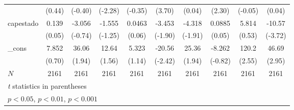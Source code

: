{\begin{tabular}{l*{9}{c}}
            &      (0.44)         &     (-0.40)         &     (-2.28)         &     (-0.35)         &      (3.70)         &      (0.04)         &      (2.30)         &     (-0.05)         &      (0.04)         \\
[1em]
capestado   &       0.139         &      -3.056         &      -1.555         &      0.0463         &      -3.453         &      -4.318         &      0.0885         &       5.814         &      -10.57\sym{***}\\
            &      (0.05)         &     (-0.74)         &     (-1.25)         &      (0.06)         &     (-1.90)         &     (-1.91)         &      (0.05)         &      (0.53)         &     (-3.72)         \\
[1em]
\_cons      &       7.852         &       36.06         &       12.64         &       5.323         &      -20.56\sym{*}  &       25.36         &      -8.262         &       120.2\sym{*}  &       46.69\sym{**} \\
            &      (0.70)         &      (1.94)         &      (1.56)         &      (1.14)         &     (-2.42)         &      (1.94)         &     (-0.82)         &      (2.55)         &      (2.95)         \\
\hline
\(N\)       &        2161         &        2161         &        2161         &        2161         &        2161         &        2161         &        2161         &        2161         &        2161         \\
\hline\hline
\multicolumn{10}{l}{\footnotesize \textit{t} statistics in parentheses}\\
\multicolumn{10}{l}{\footnotesize \sym{*} \(p<0.05\), \sym{**} \(p<0.01\), \sym{***} \(p<0.001\)}\\
\end{tabular}
}
